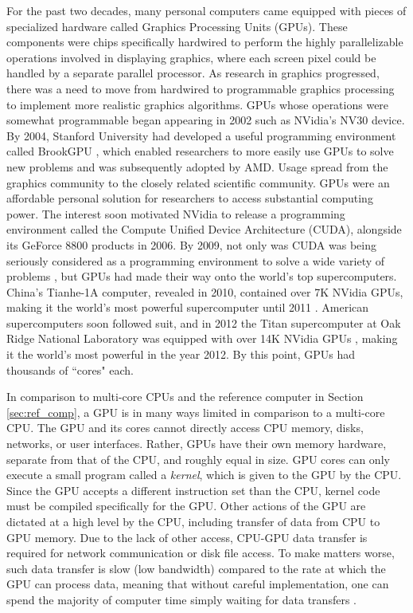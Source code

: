 For the past two decades, many personal computers came
equipped with pieces of specialized hardware called
Graphics Processing Units (GPUs).
These components were chips specifically hardwired to
perform the highly parallelizable operations involved
in displaying graphics, where each screen pixel could be handled
by a separate parallel processor.
As research in graphics progressed, there was a need to
move from hardwired to programmable graphics processing
to implement more realistic graphics algorithms.
GPUs whose operations were somewhat programmable began appearing
in 2002 such as NVidia's NV30 device.
By 2004, Stanford University had developed a useful programming
environment called BrookGPU \cite{buck2004brook}, which
enabled researchers to more easily use GPUs to solve new problems
and was subsequently adopted by AMD.
Usage spread from the graphics community to the closely
related scientific community.
GPUs were an affordable personal solution for researchers
to access substantial computing power.
The interest soon motivated NVidia to release a programming
environment called the Compute Unified Device Architecture (CUDA),
alongside its GeForce 8800 products in 2006.
By 2009, not only was CUDA was being seriously considered as a programming
environment to solve a wide variety of problems \cite{hwu2009compute},
but GPUs had made their way onto the world's top supercomputers.
China's Tianhe-1A computer, revealed in 2010,
contained over 7K NVidia GPUs, making it the world's
most powerful supercomputer until 2011 \cite{yang2011tianhe}.
American supercomputers soon followed suit, and in 2012
the Titan supercomputer at Oak Ridge National Laboratory
was equipped with over 14K NVidia GPUs \cite{bland2012titan},
making it the world's most powerful in the year 2012.
By this point, GPUs had thousands of ``cores" each.

In comparison to multi-core CPUs and the reference computer
in Section \ref{sec:ref_comp},
a GPU is in many ways limited in comparison to a multi-core CPU.
The GPU and its cores cannot directly access CPU memory,
disks, networks, or user interfaces.
Rather, GPUs have their own memory hardware, separate from that of the CPU,
and roughly equal in size.
GPU cores can only execute a small program called a \emph{kernel},
which is given to the GPU by the CPU.
Since the GPU accepts a different instruction set than the CPU,
kernel code must be compiled specifically for the GPU.
Other actions of the GPU are dictated at a high level
by the CPU, including transfer of data from CPU to GPU memory.
Due to the lack of other access, CPU-GPU data transfer is required
for network communication or disk file access.
To make matters worse, such data transfer is slow (low bandwidth)
compared to the rate at which the GPU can process data,
meaning that without careful implementation, one can spend
the majority of computer time simply waiting for data transfers
\cite{gregg2011data}.

